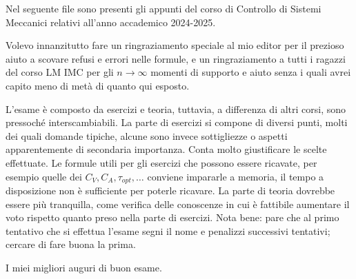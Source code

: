 \intro
Nel seguente file sono presenti gli appunti del corso di Controllo di Sistemi Meccanici relativi all'anno accademico 2024-2025.

\vspace{5pt}
\hline
\vspace{5pt}

Volevo innanzitutto fare un ringraziamento speciale al mio editor per il prezioso aiuto a scovare refusi e errori nelle formule, e un ringraziamento a tutti i ragazzi del corso LM IMC per gli \(n\rightarrow \infty\) momenti di supporto e aiuto senza i quali avrei capito meno di metà di quanto qui esposto.

\vspace{5pt}
\hline
\vspace{5pt}

L'esame è composto da esercizi e teoria, tuttavia, a differenza di altri corsi, sono pressoché interscambiabili.
La parte di esercizi si compone di diversi punti, molti dei quali domande tipiche, alcune sono invece sottigliezze o aspetti apparentemente di secondaria importanza. Conta molto giustificare le scelte effettuate.
Le formule utili per gli esercizi che possono essere ricavate, per esempio quelle dei \(C_V,C_A,\tau_{opt},\dots\) conviene impararle a memoria, il tempo a disposizione non è sufficiente per poterle ricavare.
La parte di teoria dovrebbe essere più tranquilla, come verifica delle conoscenze in cui è fattibile aumentare il voto rispetto quanto preso nella parte di esercizi.
Nota bene: pare che al primo tentativo che si effettua l'esame segni il nome e penalizzi successivi tentativi; cercare di fare buona la prima.

\vspace{5pt}

I miei migliori auguri di buon esame.